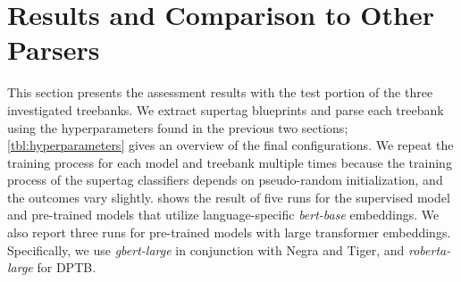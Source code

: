 \documentclass[../../document.tex]{subfiles}
\begin{document}
    \section{Results and Comparison to Other Parsers}\label{sec:results}
    This section presents the assessment results with the test portion of the three investigated treebanks.
    We extract supertag blueprints and parse each treebank using the hyperparameters found in the previous two sections; \cref{tbl:hyperparameters} gives an overview of the final configurations.
    We repeat the training process for each model and treebank multiple times because the training process of the supertag classifiers depends on pseudo-random initialization, and the outcomes vary slightly.
     shows the result of five runs for the supervised model and pre-trained models that utilize language-specific \emph{bert-base} embeddings.
    We also report three runs for pre-trained models with large transformer embeddings.
    Specifically, we use \emph{gbert-large} \citep{Cha20} in conjunction with Negra and Tiger, and \emph{roberta-large} \citep{roberta} for DPTB.
\end{document}
